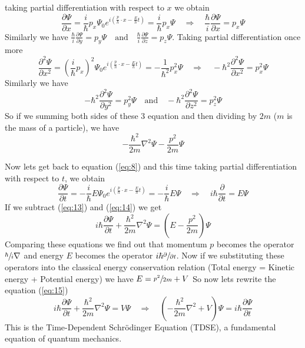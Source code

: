 \documentclass[11pt]{article}
\begin{document}
taking partial differentiation with respect to $x$ we obtain
\begin{equation}
	\frac{\partial \Psi}{\partial x} = \frac{i}{\hbar} p_x \Psi_0 e^{i(\frac{p}{h} \cdot x - \frac{E}{h} t)} = \frac{i}{\hbar} p_x \Psi \quad \Rightarrow \quad
	\frac{\hbar}{i} \frac{\partial \Psi}{\partial x} = p_x \Psi
\end{equation}
Similarly we have $\frac{\hbar}{i} \frac{\partial \Psi}{\partial y} = p_y \Psi \quad \text{and} \quad \frac{\hbar}{i} \frac{\partial \Psi}{\partial z} = p_z \Psi$. Taking partial differentiation once more 
\begin{equation}
	\frac{\partial^2 \Psi}{\partial x^2} = (\frac{i}{\hbar} p_x)^2 \Psi_0 e^{i(\frac{p}{h} \cdot x - \frac{E}{h} t)} = - \frac{1}{\hbar^2} p_x^2 \Psi \quad \Rightarrow \quad
	- \hbar^2 \frac{\partial^2 \Psi}{\partial x^2} = p_x^2 \Psi
\end{equation}
Similarly we have
\begin{equation}
	- \hbar^2 \frac{\partial^2 \Psi}{\partial y^2} = p_y^2 \Psi \quad \text{and} \quad - \hbar^2 \frac{\partial^2 \Psi}{\partial z^2} = p_z^2 \Psi
\end{equation}
So if we summing both sides of these 3 equation and then dividing by $2m$ ($m$ is the mass of a particle), we have
\begin{equation} \label{eq:13}
	- \frac{\hbar ^ 2}{2m} \nabla^2 \Psi - \frac{p^2}{2m} \Psi
\end{equation}

Now lets get back to equation (\ref{eq:8}) and this time taking partial differentiation with respect to $t$, we obtain
\begin{equation} \label{eq:14}
	\frac{\partial \Psi }{\partial t} = - \frac{i}{\hbar} E \Psi_0 e^{i(\frac{p}{h} \cdot x - \frac{E}{h} t)} = - \frac{i}{\hbar} E \Psi \quad \Rightarrow \quad 
	i \hbar \frac{\partial}{\partial t} = E \Psi
\end{equation}
If we subtract (\ref{eq:13}) and (\ref{eq:14}) we get
\begin{equation} \label{eq:15}
	i \hbar \frac{\partial \Psi}{\partial t} + \frac{\hbar ^2}{2m} \nabla^2 \Psi = (E - \frac{p^2}{2m}) \Psi
\end{equation}
Comparing these equations we find out that momentum $p$ becomes the operator $ \sfrac{\hbar}{i} \nabla$ and energy $E$ becomes the operator $ i \hbar \sfrac{\partial}{\partial t}$. Now if we substituting these operators into the classical energy conservation relation (Total energy = Kinetic energy + Potential energy) we have $E = \sfrac{p^2}{2m} + V$ So now lets rewrite the equation (\ref{eq:15})
\begin{equation} \label{eq:TDSE}
	i \hbar \frac{\partial \Psi}{\partial t} + \frac{\hbar ^ 2}{2m} \nabla^2 \Psi = V \Psi \quad \Rightarrow \quad
	(- \frac{\hbar ^ 2}{2m} \nabla^2 + V) \Psi = i \hbar \frac{\partial \Psi}{\partial t}
\end{equation}
This is the Time-Dependent Schrödinger Equation (TDSE), a fundamental equation of quantum mechanics. 
\end{document}
